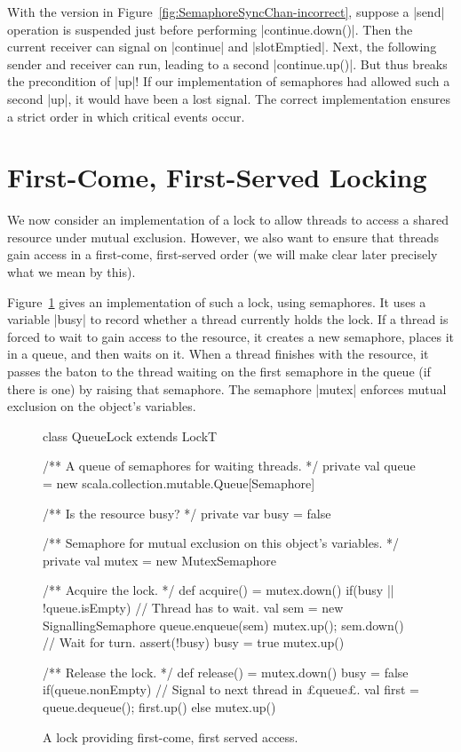 
With the version in Figure~\ref{fig:SemaphoreSyncChan-incorrect}, suppose a
|send| operation is suspended just before performing |continue.down()|.  Then
the current receiver can signal on |continue| and |slotEmptied|.  Next, the
following sender and receiver can run, leading to a second |continue.up()|.
But thus breaks the precondition of |up|!  If our implementation of semaphores
had allowed such a second |up|, it would have been a lost signal.  The correct
implementation ensures a strict order in which critical events occur.



\section{First-Come, First-Served Locking}
\label{sec:queueLock}

We now consider an implementation of a lock to allow threads to access a
shared resource under mutual exclusion.  However, we also want to ensure that
threads gain access in a first-come, first-served order (we will make clear
later precisely what we mean by this). 
%

Figure~\ref{fig:QueueLock} gives an implementation of such a lock, using
semaphores.  It uses a variable |busy| to record whether a thread currently
holds the lock.  If a thread is forced to wait to gain access to the resource,
it creates a new semaphore, places it in a queue, and then waits on it.  When
a thread finishes with the resource, it passes the baton to the thread waiting
on the first semaphore in the queue (if there is one) by raising that
semaphore.  The semaphore |mutex| enforces mutual exclusion on the object's
variables.


\begin{figure}
\begin{scala}
class QueueLock extends LockT{
  /** A queue of semaphores for waiting threads. */
  private val queue = new scala.collection.mutable.Queue[Semaphore]

  /** Is the resource busy? */
  private var busy = false

  /** Semaphore for mutual exclusion on this object's variables. */
  private val mutex = new MutexSemaphore

  /** Acquire the lock. */
  def acquire() = {
    mutex.down()
    if(busy || !queue.isEmpty){ // Thread has to wait.
      val sem = new SignallingSemaphore
      queue.enqueue(sem)
      mutex.up(); sem.down() // Wait for turn.
      assert(!busy)  
    }
    busy = true
    mutex.up()
  }

  /** Release the lock. */
  def release() = {
    mutex.down()
    busy = false
    if(queue.nonEmpty){ // Signal to next thread in £queue£.
      val first = queue.dequeue(); first.up()
    }
    else mutex.up()
  } 
}
\end{scala}
\caption{A lock providing first-come, first served access.}
\label{fig:QueueLock}
\end{figure}

